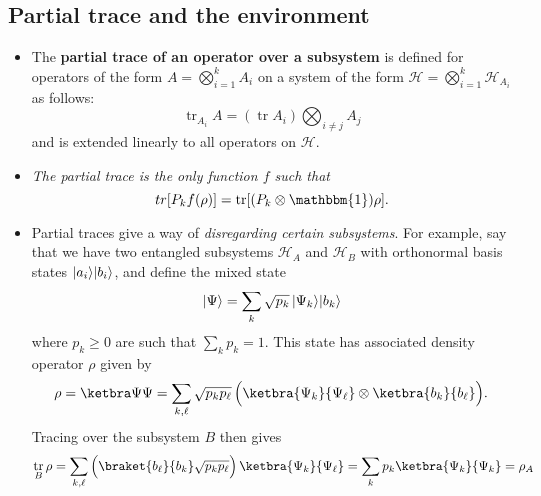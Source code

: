 \documentclass[10pt]{article}
\DeclarePairedDelimiter\ket{\lvert}{\rangle}
\newcommand{\hilb}{\mathcal{H}}
\DeclareMathOperator{\tr}{tr}
\begin{document}
        \subsection{Partial trace and the environment}

            \begin{itemize}
                \item The \textbf{partial trace of an operator over a subsystem} is defined for operators of the form $A=\bigotimes_{i=1}^k A_i$ on a system of the form $\hilb=\bigotimes_{i=1}^k\hilb_{A_i}$ as follows:
                    \begin{equation*}
                        \tr_{A_i}A=(\tr A_i)\bigotimes_{i\neq j} A_j
                    \end{equation*}
                    and is extended linearly to all operators on $\hilb$.
                \item \emph{The partial trace is the only function $f$ such that}
                    \begin{equation*}
                        tr[P_kf(\rho)] = \tr[(P_k\otimes\mathbbm{1})\rho].
                    \end{equation*}
                \item Partial traces give a way of \emph{disregarding certain subsystems}.
                    For example, say that we have two entangled subsystems $\hilb_A$ and $\hilb_B$ with orthonormal basis states $\ket{a_i}\ket{b_i}$, and define the mixed state
                    \begin{equation*}
                        \ket\Psi = \sum_k \sqrt{p_k}\,\ket{\Psi_k}\ket{b_k}
                    \end{equation*}
                    where $p_k\geqslant0$ are such that $\sum_k p_k=1$.
                    This state has associated density operator $\rho$ given by
                    \begin{equation*}
                        \rho = \ketbra\Psi\Psi = \sum_{k,\ell}\sqrt{p_kp_\ell}\,\Big(\ketbra{\Psi_k}{\Psi_\ell}\otimes\ketbra{b_k}{b_\ell}\Big).
                    \end{equation*}
                    Tracing over the subsystem $B$ then gives
                    \begin{equation*}
                        \tr_B\rho = \sum_{k,\ell}\Big(\braket{b_\ell}{b_k}\sqrt{p_kp_\ell}\Big)\,\ketbra{\Psi_k}{\Psi_\ell} = \sum_kp_k\ketbra{\Psi_k}{\Psi_k} = \rho_A
                    \end{equation*}

\end{itemize}
\end{document}

